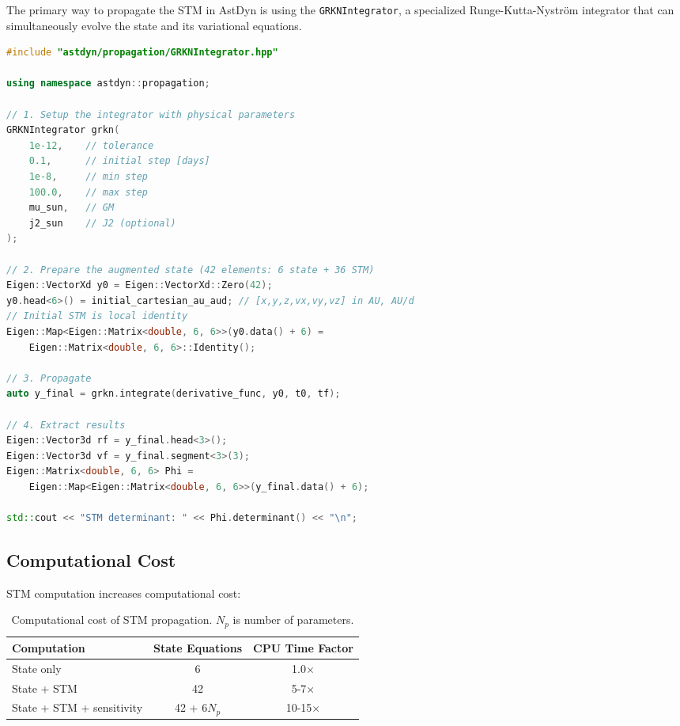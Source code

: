 The primary way to propagate the STM in AstDyn is using the \texttt{GRKNIntegrator}, a specialized Runge-Kutta-Nyström integrator that can simultaneously evolve the state and its variational equations.

\begin{lstlisting}[language=C++,caption={STM propagation using GRKNIntegrator}]
#include "astdyn/propagation/GRKNIntegrator.hpp"

using namespace astdyn::propagation;

// 1. Setup the integrator with physical parameters
GRKNIntegrator grkn(
    1e-12,    // tolerance
    0.1,      // initial step [days]
    1e-8,     // min step
    100.0,    // max step
    mu_sun,   // GM
    j2_sun    // J2 (optional)
);

// 2. Prepare the augmented state (42 elements: 6 state + 36 STM)
Eigen::VectorXd y0 = Eigen::VectorXd::Zero(42);
y0.head<6>() = initial_cartesian_au_aud; // [x,y,z,vx,vy,vz] in AU, AU/d
// Initial STM is local identity
Eigen::Map<Eigen::Matrix<double, 6, 6>>(y0.data() + 6) = 
    Eigen::Matrix<double, 6, 6>::Identity();

// 3. Propagate
auto y_final = grkn.integrate(derivative_func, y0, t0, tf);

// 4. Extract results
Eigen::Vector3d rf = y_final.head<3>();
Eigen::Vector3d vf = y_final.segment<3>(3);
Eigen::Matrix<double, 6, 6> Phi = 
    Eigen::Map<Eigen::Matrix<double, 6, 6>>(y_final.data() + 6);

std::cout << "STM determinant: " << Phi.determinant() << "\n";
\end{lstlisting}

\subsection{Computational Cost}

STM computation increases computational cost:

\begin{table}[htbp]
\centering
\begin{tabular}{lcc}
\toprule
\textbf{Computation} & \textbf{State Equations} & \textbf{CPU Time Factor} \\
\midrule
State only & 6 & 1.0$\times$ \\
State + STM & 42 & 5-7$\times$ \\
State + STM + sensitivity & 42 + 6$N_p$ & 10-15$\times$ \\
\bottomrule
\end{tabular}
\caption{Computational cost of STM propagation. $N_p$ is number of parameters.}
\label{tab:stm_cost}
\end{table}


